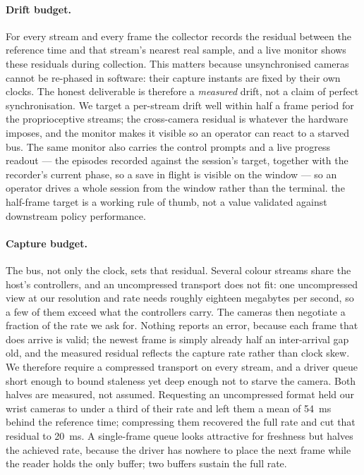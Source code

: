 \paragraph{Drift budget.} For every stream and every frame the collector
records the residual between the reference time and that stream's nearest
real sample, and a live monitor shows these residuals during collection.
This matters because unsynchronised cameras cannot be re-phased in
software: their capture instants are fixed by their own clocks. The honest
deliverable is therefore a \emph{measured} drift, not a claim of perfect
synchronisation. We target a per-stream drift well within half a frame
period for the proprioceptive streams; the cross-camera residual is
whatever the hardware imposes, and the monitor makes it visible so an
operator can react to a starved bus. The same monitor also carries the
control prompts and a live progress readout --- the episodes recorded
against the session's target, together with the recorder's current phase, so
a save in flight is visible on the window --- so an operator drives a whole
session from the window rather than the terminal. \unjustified{} the half-frame target
is a working rule of thumb, not a value validated against downstream policy
performance.

\paragraph{Capture budget.} The bus, not only the clock, sets that residual.
Several colour streams share the host's controllers, and an uncompressed
transport does not fit: one uncompressed view at our resolution and rate needs
roughly eighteen megabytes per second, so a few of them exceed what the
controllers carry. The cameras then negotiate a fraction of the rate we ask
for. Nothing reports an error, because each frame that does arrive is valid;
the newest frame is simply already half an inter-arrival gap old, and the
measured residual reflects the capture rate rather than clock skew. We
therefore require a compressed transport on every stream, and a driver queue
short enough to bound staleness yet deep enough not to starve the camera. Both
halves are measured, not assumed. Requesting an uncompressed format held our
wrist cameras to under a third of their rate and left them a mean of
\SI{54}{\milli\second} behind the reference time; compressing them recovered
the full rate and cut that residual to \SI{20}{\milli\second}. A single-frame
queue looks attractive for freshness but halves the achieved rate, because the
driver has nowhere to place the next frame while the reader holds the only
buffer; two buffers sustain the full rate.

